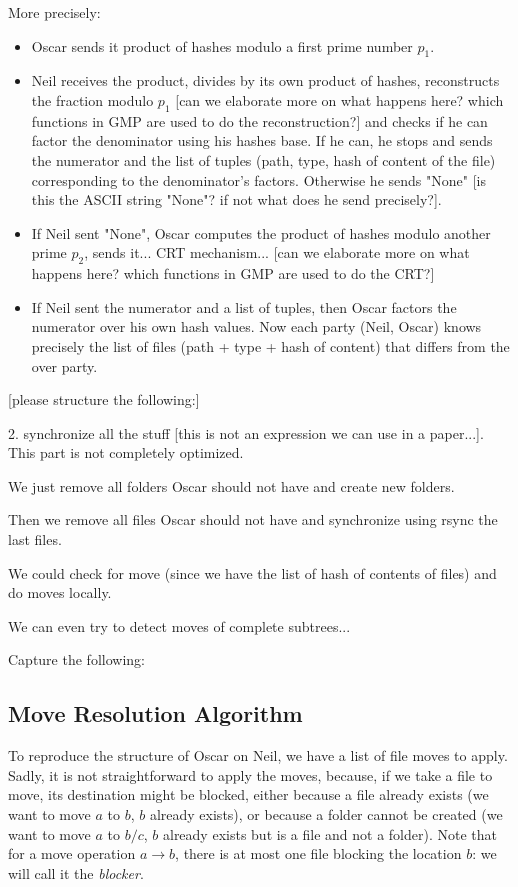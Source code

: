 \documentclass[11pt]{llncs}
\begin{document}
More precisely:
\begin{itemize}
\item Oscar sends it product of hashes modulo a first prime number $p_1$.
\item Neil receives the product, divides by its own product of hashes, reconstructs the fraction modulo $p_1$ [can we elaborate more on what happens here? which functions in GMP are used to do the reconstruction?] and checks if he can factor the denominator using his hashes base. If he can, he stops and sends the numerator and the list of tuples (path, type, hash of content of the file) corresponding to the denominator's factors. Otherwise he sends "None" [is this the ASCII string "None"? if not what does he send precisely?].
\item If Neil sent "None", Oscar computes the product of hashes modulo another prime $p_2$, sends it... CRT mechanism... [can we elaborate more on what happens here? which functions in GMP are used to do the CRT?]
\item If Neil sent the numerator and a list of tuples, then Oscar factors the numerator over his own hash values. Now each party (Neil, Oscar) knows precisely the list of files (path + type + hash of content) that differs from the over party.
\end{itemize}

[please structure the following:]\smallskip

2. synchronize all the stuff [this is not an expression we can use in a paper...]. This part is not completely optimized.\smallskip

We just remove all folders Oscar should not have and create new folders.\smallskip

Then we remove all files Oscar should not have and synchronize using rsync the last files.\smallskip

We could check for move (since we have the list of hash of contents of files) and do moves locally.\smallskip

We can even try to detect moves of complete subtrees...\smallskip


Capture the following: \smallskip


\subsection{Move Resolution Algorithm}

To reproduce the structure of Oscar on Neil, we have a list of file moves to
apply. Sadly, it is not straightforward to apply the moves, because, if we take
a file to move, its destination might be blocked, either because a file already
exists (we want to move $a$ to $b$, $b$ already exists), or because a folder
cannot be created (we want to move $a$ to $b/c$, $b$ already exists but is a
file and not a folder). Note that for a move operation $a \rightarrow b$, there
is at most one file blocking the location $b$: we will call it the
\emph{blocker}.
\end{document}
